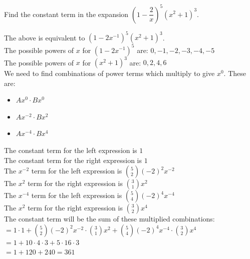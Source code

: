 \documentclass[12pt, a4paper, titlepage, twoside]{article}
\newcounter{excount}[subsection]
\begin{document}
	\begin{ex}
		Find the constant term in the expansion ${\left(1-\dfrac{2}{x}\right)}^5 {\left(x^2+1\right)}^3$.
		
		\hfill
		\tcbline
		\hfill
		
		The above is equivalent to ${\left(1-2x^{-1}\right)}^5 {\left(x^2+1\right)}^3$.\\
		
		The possible powers of $x$ for ${\left(1-2x^{-1}\right)}^5$ are: $0, -1, -2, -3, -4, -5$\\
		The possible powers of $x$ for ${\left(x^2+1\right)}^3$ are: $0, 2, 4, 6$\\
		
		We need to find combinations of power terms which multiply to give $x^0$. These are:
		
		\begin{itemize}
			\item $Ax^0 \cdot Bx^0$
			\item $Ax^{-2} \cdot Bx^2$
			\item $Ax^{-4} \cdot Bx^4$
		\end{itemize}
		
		The constant term for the left expression is $1$\\
		The constant term for the right expression is $1$\\
		The $x^{-2}$ term for the left expression is $\displaystyle {5 \choose 2} (-2)^2 x^{-2}$\\
		The $x^2$ term for the right expression is $\displaystyle {3 \choose 1} x^2$\\
		The $x^{-4}$ term for the left expression is $\displaystyle {5 \choose 4} (-2)^4 x^{-4}$\\
		The $x^2$ term for the right expression is $\displaystyle {3 \choose 2} x^4$\\
		
		The constant term will be the sum of these multiplied combinations:\\
		
		$\displaystyle = 1 \cdot 1 + {5 \choose 2} (-2)^2 x^{-2} \cdot {3 \choose 1} x^2 + {5 \choose 4} (-2)^4 x^{-4} \cdot 
		{3 \choose 2} x^4$\\
		
		$\displaystyle = 1 + 10 \cdot 4 \cdot 3 + 5 \cdot 16 \cdot 3$\\
		
		$\displaystyle = 1 + 120 + 240 = 361$\\
	\end{ex}
	
\end{document}
